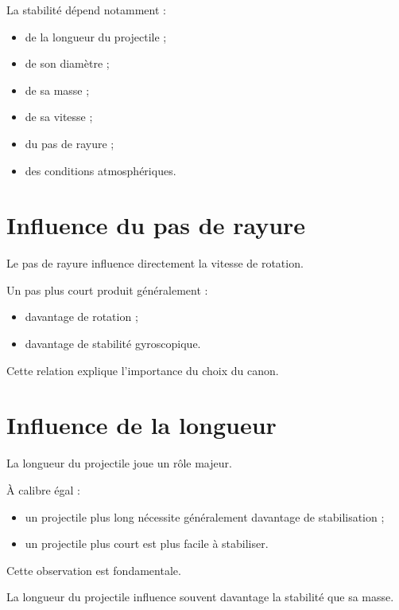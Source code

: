 La stabilité dépend notamment :

\begin{itemize}
    \item de la longueur du projectile ;
    \item de son diamètre ;
    \item de sa masse ;
    \item de sa vitesse ;
    \item du pas de rayure ;
    \item des conditions atmosphériques.
\end{itemize}

\section{Influence du pas de rayure}

Le pas de rayure influence directement la vitesse de rotation.

Un pas plus court produit généralement :

\begin{itemize}
    \item davantage de rotation ;
    \item davantage de stabilité gyroscopique.
\end{itemize}

Cette relation explique l'importance du choix du canon.

\section{Influence de la longueur}

La longueur du projectile joue un rôle majeur.

À calibre égal :

\begin{itemize}
    \item un projectile plus long nécessite généralement davantage de
          stabilisation ;
    \item un projectile plus court est plus facile à stabiliser.
\end{itemize}

Cette observation est fondamentale.

\begin{aretenir}

La longueur du projectile influence souvent davantage la stabilité que sa
masse.

\end{aretenir}

